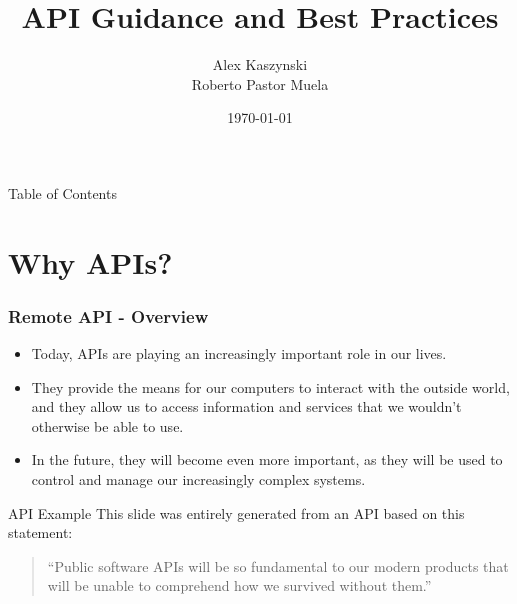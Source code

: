 \documentclass[t]{beamer}
\begin{document}

\title{API Guidance and Best Practices}
\author{Alex Kaszynski \\ Roberto Pastor Muela}
\date{\today}

\titleframe{}



\begin{frame}{Table of Contents}
  \tableofcontents
  \vspace{200pt}  %
\end{frame}


\section{Why APIs?}

\begin{frame}[fragile=singleslide]
  \frametitle{Remote API - Overview}
  \vspace{-10pt}

  \begin{itemize}
  \item Today, APIs are playing an increasingly important role in our lives.
  \item They provide the means for our computers to interact with the outside world, and they allow us to access information and services that we wouldn't otherwise be able to use.
  \item In the future, they will become even more important, as they will be used to control and manage our increasingly complex systems.
  \end{itemize}

  \begin{exampleblock}{API Example}
    This slide was entirely generated from an API based on this statement:

    \begin{quote}
    ``Public software APIs will be so fundamental to our modern products that
    will be unable to comprehend how we survived without them.''
    \end{quote}

  \end{exampleblock}

\end{frame}
\end{document}
